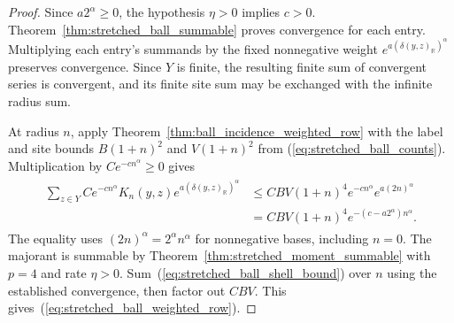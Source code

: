 \begin{proof}
    \leanok
    Since $a2^\alpha\geq0$, the hypothesis $\eta>0$ implies $c>0$.
    Theorem~\ref{thm:stretched_ball_summable} proves convergence for
    each entry.  Multiplying each entry's summands by the fixed
    nonnegative weight $e^{a(\delta(y,z)_{\mathbb R})^\alpha}$
    preserves convergence.  Since $Y$ is finite, the resulting finite
    sum of convergent series is convergent, and its finite site sum
    may be exchanged with the infinite radius sum.

    At radius $n$, apply
    Theorem~\ref{thm:ball_incidence_weighted_row} with the label and
    site bounds $B(1+n)^2$ and $V(1+n)^2$ from
    (\ref{eq:stretched_ball_counts}).  Multiplication by
    $C e^{-cn^\alpha}\geq0$ gives
    \begin{align}
        \begin{aligned}
            \sum_{z\in Y}C e^{-cn^\alpha}K_n(y,z)
            e^{a(\delta(y,z)_{\mathbb R})^\alpha}
             & \leq CBV(1+n)^4e^{-cn^\alpha}e^{a(2n)^\alpha} \\
             & =CBV(1+n)^4e^{-(c-a2^\alpha)n^\alpha}.
        \end{aligned}
        \label{eq:stretched_ball_shell_bound}
    \end{align}
    The equality uses $(2n)^\alpha=2^\alpha n^\alpha$ for
    nonnegative bases, including $n=0$.
    The majorant is summable by
    Theorem~\ref{thm:stretched_moment_summable} with $p=4$ and
    rate $\eta>0$.  Sum~(\ref{eq:stretched_ball_shell_bound}) over
    $n$ using the established convergence, then factor out $CBV$.
    This gives~(\ref{eq:stretched_ball_weighted_row}).
\end{proof}

